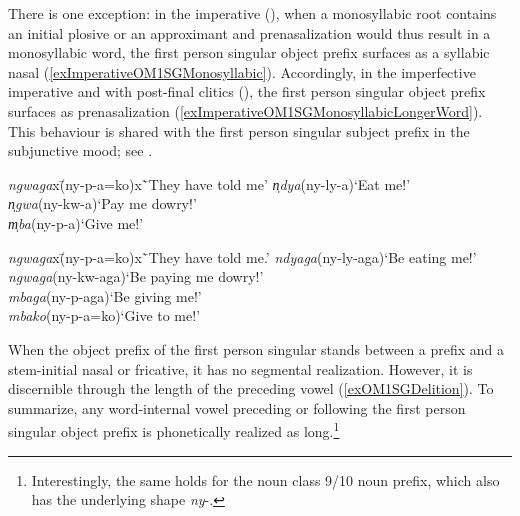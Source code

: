There is one exception: in the imperative (), when a monosyllabic root contains an initial plosive or an approximant and prenasalization would thus result in a monosyllabic word, the first person singular object prefix surfaces as a syllabic nasal (\ref{exImperativeOM1SGMonosyllabic}). Accordingly, in the imperfective imperative and with post-final clitics (), the first person singular object prefix surfaces as prenasalization (\ref{exImperativeOM1SGMonosyllabicLongerWord}). This behaviour is shared with the first person singular subject prefix in the subjunctive mood; see .

\begin{exe}
	\ex\label{exImperativeOM1SGMonosyllabic}
	\begin{tabbing}
		\textit{ngwaga}x\=(\degree ny-p-a=ko)x\=`They have told me'\kill
		\textit{n̩dya}\>(\degree ny-ly-a)\>`Eat me!'\\
		\textit{n̩gwa}\>(\degree ny-kw-a)\>`Pay me dowry!'\\
		\textit{m̩ba}\>(\degree ny-p-a)\>`Give me!'
	\end{tabbing}
	\ex\label{exImperativeOM1SGMonosyllabicLongerWord}
	\begin{tabbing}
		\textit{ngwaga}x\=(\degree ny-p-a=ko)x\=`They have told me.'\kill
		\textit{ndyaga}\>(\degree ny-ly-aga)\>`Be eating me!'\\
		\textit{ngwaga}\>(\degree ny-kw-aga)\>`Be paying me dowry!'\\
		\textit{mbaga}\>(\degree ny-p-aga)\>`Be giving me!'\\
		\textit{mbako}\>(\degree ny-p-a=ko)\>`Give to me!'
	\end{tabbing}
\end{exe} 

\label{NasalDelition} When the object prefix of the first person singular stands between a prefix and a stem-initial nasal or fricative, it has no segmental realization. However, it is discernible through the length of the preceding vowel (\ref{exOM1SGDelition}). To summarize, any word-internal vowel preceding or following the first person singular object prefix is phonetically realized as long.\footnote{Interestingly, the same holds for the noun class 9/10 noun prefix, which also has the underlying shape \textit{ny}-.}

\clearpage %

